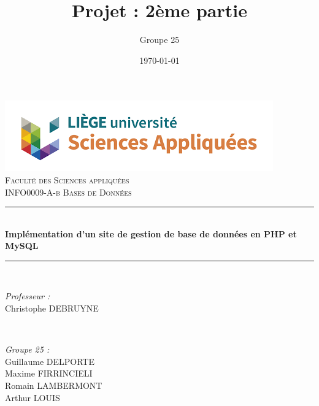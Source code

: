 \documentclass{article}
\begin{document}

\title{Projet : 2ème partie}								%
\author{Groupe 25}								%
\date{\today}											%

\makeatletter
\let\thetitle\@title
\let\theauthor\@author
\let\thedate\@date
\makeatother

\pagestyle{fancy}
\fancyhf{}
\rhead{\theauthor}
\lhead{\thetitle}
\cfoot{\thepage}

\begin{titlepage}
 \centering
 \vspace*{0.5 cm}
 \includegraphics[scale = 0.7]{figs/facsa.png}\\[1.0 cm]	%
 \textsc{\LARGE \newline\newline Faculté des Sciences appliquées}\\[2.0 cm]	%
 \textsc{\Large INFO0009-A-b Bases de Données}\\[0.5 cm]				%
 \rule{\linewidth}{0.2 mm} \\[0.4 cm]
 {\huge \bfseries Implémentation d'un site de gestion de base de données en PHP et MySQL}\\
 \rule{\linewidth}{0.2 mm} \\[1.5 cm]

 \begin{minipage}{0.5\textwidth}
 	\begin{flushleft} \large
 		\emph{Professeur :}\\
 		  Christophe DEBRUYNE\\
    \vspace{0.5cm}
 		\end{flushleft}
 		\end{minipage}~
 		\begin{minipage}{0.4\textwidth}

 		\begin{flushright} \large
 		\emph{Groupe 25 :} \\
      Guillaume DELPORTE\\
      Maxime FIRRINCIELI\\
      Romain LAMBERMONT\\
      Arthur LOUIS\\
 	\end{flushright}

 \end{minipage}\\[2 cm]


 \thedate
\end{titlepage}
\end{document}
